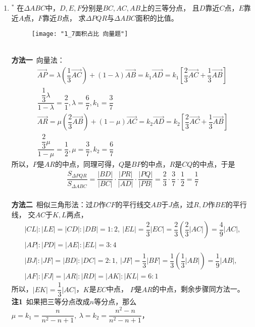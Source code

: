 \begin{enumerate}[label={【\textbf{例\thechapter.\arabic*}】},
 leftmargin=\inteval{\myenumleftmargin}pt,
 itemsep=\inteval{\myenumitempsep}pt,
 itemindent=\inteval{\myenumitemindent}pt]
\item $ ^* $
在$ \Delta ABC $中，$ D,E,F $分别是$ BC,AC,AB $上的三等分点，
且$ D $靠近$ C $点，$ E $靠近$ A $点，$ F $靠近$ B $点，
求$ \Delta PQR $与$ \Delta ABC $面积的比值。
\begin{figure}[!ht]
    \centering
    \texttt{[image: "1\_7面积占比 向量题"]}
\end{figure}
\\
\textbf{方法一}\ 向量法：\\
\begin{gather*}
    \vec{AP}=\lambda \left(\dfrac{1}{3}\vec{AC} 
    \right) +(1-\lambda)
    \vec{AB}=k_1\vec{AD}=k_1\left[
    \dfrac{2}{3}\vec{AC}+
    \dfrac{1}{3}\vec{AB}\right] \\
    \dfrac{\dfrac{1}{3}\lambda}{1-\lambda}=\dfrac{2}{1},
    \lambda=\dfrac{6}{7},k_1=\dfrac{3}{7} \\
    \vec{AR}=\mu \left(\dfrac{2}{3}\vec{AB} \right) +(1-\mu)\vec{AC}=k_2\vec{AD}=k_2\left[ \dfrac{2}{3}\vec{AC}+
    \dfrac{1}{3}\vec{AB} \right] \\
    \dfrac{\dfrac{2}{3}\mu}{1-\mu}=\dfrac{1}{2},\mu=\dfrac{3}{7},
    k_2=\dfrac{6}{7} 
\end{gather*}
所以，$ P $是$ AR $的中点，同理可得，$ Q $是$ BP $的中点，$ R $是$ CQ $的中点，于是
\begin{gather*}
    \dfrac{S_{\Delta PQR}}{S_{\Delta ABC}} =\dfrac{|BD|}{|BC|}\cdot
    \dfrac{|PR|}{|AD|}\cdot \dfrac{|PQ|}{|PB|}=\dfrac{2}{3}\cdot \dfrac{3}{7}\cdot
    \dfrac{1}{2} =\dfrac{1}{7}
\end{gather*}
\\
\textbf{方法二}\ 相似三角形法：过$ D $作$ CF $的平行线交$ AB $于$ J $点，过$ R,D $作$ BE $的平行线，
交$ AC $于$ K,L $两点，
\begin{gather*}
    |CL|:|LE|=|CD|:|DB|=1:2,\ |EL|=\dfrac{2}{3}|EC|=
    \dfrac{2}{3}\left(\dfrac{2}{3} |AC|\right) =\dfrac{4}{9}|AC|,\\
    |AP|:|PD|=|AE|:|EL|=3:4 \\
    |BJ|:|JF|=|BD|:|DC|=2:1,\ |JF|=\dfrac{1}{3}|BF|=
    \dfrac{1}{3}\left(\dfrac{1}{3}|AB| \right)=\dfrac{1}{9}|AB|, \\
    |AF|:|FJ|=|AR|:|RD|=|AK|:|KL|=6:1  
\end{gather*}
所以，$ |EK|=\dfrac{1}{3}|AC| $，$ K $是$ EC $中点，
$ P $是$ AR $的中点，剩余步骤同方法一。\\
\textbf{注1}\ 如果把三等分点改成$ n $等分点，那么$     \mu=k_1=\dfrac{n}{n^2-n+1},\ \lambda=k_2=\dfrac{n^2-n}{n^2-n+1} $，

\end{enumerate}
